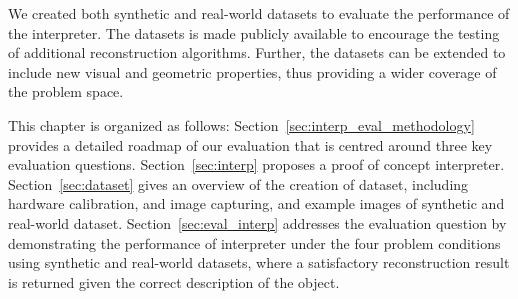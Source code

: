 We created both synthetic and real-world datasets to evaluate the performance of the interpreter. The datasets is made publicly available to encourage the testing of additional reconstruction algorithms. Further, the datasets can be extended to include new visual and geometric properties, thus providing a wider coverage of the problem space.




This chapter is organized as follows: Section~\ref{sec:interp_eval_methodology} provides a detailed roadmap of our evaluation that is centred around three key evaluation questions. Section~\ref{sec:interp} proposes a proof of concept interpreter. Section~\ref{sec:dataset} gives an overview of the creation of dataset, including hardware calibration, and image capturing, and example images of synthetic and real-world dataset. Section~\ref{sec:eval_interp} addresses the evaluation question by demonstrating the performance of interpreter under the four problem conditions using synthetic and real-world datasets, where a satisfactory reconstruction result is returned given the correct description of the object.

